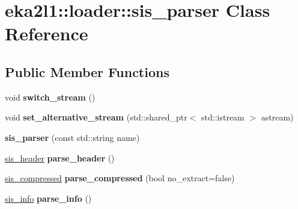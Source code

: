 \hypertarget{classeka2l1_1_1loader_1_1sis__parser}{}\section{eka2l1\+:\+:loader\+:\+:sis\+\_\+parser Class Reference}
\label{classeka2l1_1_1loader_1_1sis__parser}
\subsection*{Public Member Functions}
\begin{DoxyCompactItemize}
\item 
\mbox{\label{classeka2l1_1_1loader_1_1sis__parser_a6077746be8cd560cda38ac95de0c5398}} 
void {\bfseries switch\+\_\+stream} ()
\item 
\mbox{\label{classeka2l1_1_1loader_1_1sis__parser_aa7032a10d3d28258fff39d3b12c45d21}} 
void {\bfseries set\+\_\+alternative\+\_\+stream} (std\+::shared\+\_\+ptr$<$ std\+::istream $>$ astream)
\item 
\mbox{\label{classeka2l1_1_1loader_1_1sis__parser_a4e5a87aba6b90a1f7a40f65f99665e63}} 
{\bfseries sis\+\_\+parser} (const std\+::string name)
\item 
\mbox{\label{classeka2l1_1_1loader_1_1sis__parser_a7ed4933e7d9cafdb3915a80643483db9}} 
\mbox{\hyperlink{structeka2l1_1_1loader_1_1sis__header}{sis\+\_\+header}} {\bfseries parse\+\_\+header} ()
\item 
\mbox{\label{classeka2l1_1_1loader_1_1sis__parser_a8345f6f385def9abad80709cfda1f8d2}} 
\mbox{\hyperlink{structeka2l1_1_1loader_1_1sis__compressed}{sis\+\_\+compressed}} {\bfseries parse\+\_\+compressed} (bool no\+\_\+extract=false)
\item 
\mbox{\label{classeka2l1_1_1loader_1_1sis__parser_a6660dbd6cc315edfd3b97c0afe22cbdf}} 
\mbox{\hyperlink{structeka2l1_1_1loader_1_1sis__info}{sis\+\_\+info}} {\bfseries parse\+\_\+info} ()
\item 
\mbox{\label{classeka2l1_1_1loader_1_1sis__parser_a0efab108b68442135643dd4c337ad00f}} 

\end{DoxyCompactItemize}
